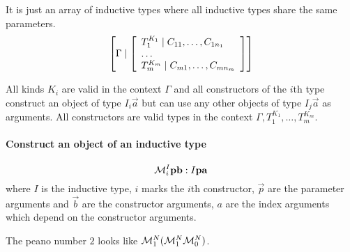 It is just an array of inductive types where all inductive types share the same
parameters.
$$
    \left[\Gamma \mid
    \left[ \begin{array}{l} 
        T_1^{K_1} \mid C_{11}, \ldots, C_{1n_1}
        \\
        \ldots
        \\
        T_m^{K_m} \mid C_{m1}, \ldots, C_{mn_m}
     \end{array} \right]
    \right]
$$

All kinds $K_i$ are valid in the context $\Gamma$ and all constructors of the
$i$th type construct an object of type $I_i \vec a$ but can use any other
objects of type $I_j \vec a$ as arguments. All constructors are valid types in
the context $\Gamma, T_1^{K_1}, \ldots , T_m^{K_m}$.



\paragraph{Construct an object of an inductive type}
$$
    {\cal M}^I_i {\mathbf p} {\mathbf b}: I {\mathbf p} {\mathbf a}
$$
where $I$ is the inductive type, $i$ marks the $i$th constructor, $\vec p$ are
the parameter arguments and $\vec b$ are the constructor arguments, $a$ are the
index arguments which depend on the constructor arguments.

The peano number $2$ looks like $ {\cal M}^N_1 ({\cal M}^N_1 {\cal M}^N_0) $.
